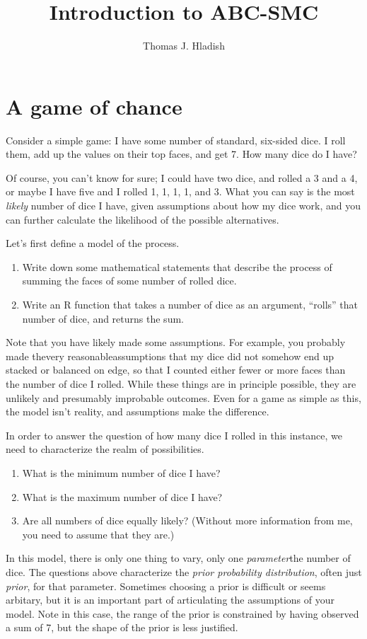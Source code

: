 \documentclass[a4paper,10pt]{article}
\title{Introduction to ABC-SMC}
\author{Thomas J. Hladish}
\begin{document}
\maketitle

\begin{abstract}

\end{abstract}

\section{A game of chance}
Consider a simple game:  I have some number of standard, six-sided dice.  I roll them, add up the values on their top faces, and get 7.  How many dice do I have?

Of course, you can't know for sure; I could have two dice, and rolled a 3 and a 4, or maybe I have five and I rolled 1, 1, 1, 1, and 3.  What you can say is the most \textit{likely} number of dice I have, given assumptions about how my dice work, and you can further calculate the likelihood of the possible alternatives.

Let's first define a model of the process.
\begin{enumerate}
 \item Write down some mathematical statements that describe the process of summing the faces of some number of rolled dice.
 \item Write an R function that takes a number of dice as an argument, ``rolls'' that number of dice, and returns the sum.
\end{enumerate}

Note that you have likely made some assumptions.  For example, you probably made the\textemdash very reasonable\textemdash assumptions that my dice did not somehow end up stacked or balanced on edge, so that I counted either fewer or more faces than the number of dice I rolled.  While these things are in principle possible, they are unlikely and presumably improbable outcomes.  Even for a game as simple as this, the model isn't reality, and assumptions make the difference.

In order to answer the question of how many dice I rolled in this instance, we need to characterize the realm of possibilities.

\begin{enumerate}
 \item What is the minimum number of dice I have?
 \item What is the maximum number of dice I have?
 \item Are all numbers of dice equally likely? (Without more information from me, you need to assume that they are.)
\end{enumerate}

In this model, there is only one thing to vary, only one \textit{parameter}\textemdash the number of dice. The questions above characterize the \textit{prior probability distribution}, often just \textit{prior}, for that parameter.  Sometimes choosing a prior is difficult or seems arbitary, but it is an important part of articulating the assumptions of your model.  Note in this case, the range of the prior is constrained by having observed a sum of 7, but the shape of the prior is less justified.
\end{document}
